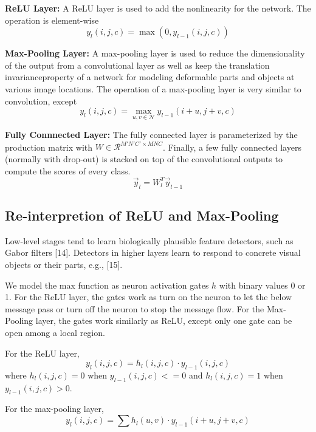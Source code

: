\textbf{ReLU Layer:}
A ReLU layer is used to add the nonlinearity for the network. The operation is element-wise
\begin{equation}
y_l(i,j,c) = \max (0,y_{l-1}(i,j,c))
\end{equation} 

\textbf{Max-Pooling Layer:}
A max-pooling layer is used to reduce the dimensionality of the output from a convolutional layer as well as keep the translation invarianceproperty of a network for modeling deformable parts and objects at various image locations. The operation of a max-pooling layer is very similar to convolution, except  
\begin{equation}
y_l(i,j,c) = \max_{u,v \in \mathcal{N}} y_{l-1}(i+u, j+v, c)
\end{equation}

\textbf{Fully Connnected Layer:} The fully connected layer is parameterized by the production matrix with $W \in \mathcal{R}^{M'N'C' \times MNC}$. 
Finally, a few fully connected layers (normally with drop-out) is stacked on top of the convolutional outputs to compute the scores of every class. 
\begin{equation}
\vec{y}_l = W_l^T  \vec{y}_{l-1}
\end{equation}

\subsection{Re-interpretion of ReLU and Max-Pooling}
Low-level stages tend to learn biologically plausible feature detectors, such as Gabor filters [14]. Detectors in higher layers learn to respond to concrete visual objects or their parts, e.g., [15].

We model the max function as neuron activation gates $h$ with binary values 0 or 1. For the ReLU layer, the gates work as turn on the neuron to let the below message pass or turn off the neuron to stop the message flow. For the Max-Pooling layer, the gates work similarly as ReLU, except only one gate can be open among a local region.

For the ReLU layer, 
\begin{equation}
y_l(i,j,c) = h_l(i,j,c) \cdot y_{l-1}(i,j,c)
\end{equation} 
where $h_l(i,j,c) = 0$ when $y_{l-1}(i,j,c) <= 0$ and $h_l(i,j,c) = 1$ when $y_{l-1}(i,j,c) > 0$.

For the max-pooling layer,
\begin{equation}
y_l(i,j,c) = \sum_{} h_l(u, v) \cdot y_{l-1}(i+u, j+v, c)
\end{equation}


